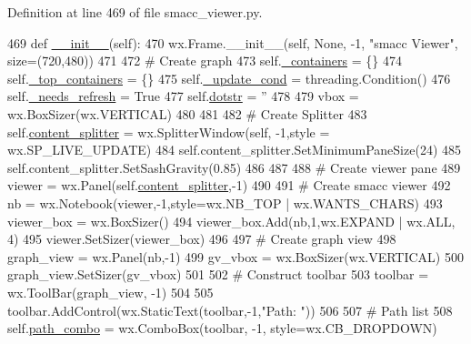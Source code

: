 Definition at line 469 of file smacc\+\_\+viewer.\+py.


\begin{DoxyCode}
469     \textcolor{keyword}{def }\hyperlink{classsmacc__viewer_1_1SmaccViewerFrame_a190917c46c5ee67c31da814f099fa044}{\_\_init\_\_}(self):
470         wx.Frame.\_\_init\_\_(self, \textcolor{keywordtype}{None}, -1, \textcolor{stringliteral}{"smacc Viewer"}, size=(720,480))
471 
472         \textcolor{comment}{# Create graph}
473         self.\hyperlink{classsmacc__viewer_1_1SmaccViewerFrame_a00ea07c6cc068340230dcac273ad5e90}{\_containers} = \{\}
474         self.\hyperlink{classsmacc__viewer_1_1SmaccViewerFrame_acc2f4310b3de2703026548d0d18387ea}{\_top\_containers} = \{\}
475         self.\hyperlink{classsmacc__viewer_1_1SmaccViewerFrame_a87c1757aa21438ca8692b2f079b8f393}{\_update\_cond} = threading.Condition()
476         self.\hyperlink{classsmacc__viewer_1_1SmaccViewerFrame_a42ba63ae6741b2ced224cc0f8aa48bff}{\_needs\_refresh} = \textcolor{keyword}{True}
477         self.\hyperlink{classsmacc__viewer_1_1SmaccViewerFrame_af4c9a551ac2933b05aaae2adcbb26d63}{dotstr} = \textcolor{stringliteral}{''}
478 
479         vbox = wx.BoxSizer(wx.VERTICAL)
480 
481 
482         \textcolor{comment}{# Create Splitter}
483         self.\hyperlink{classsmacc__viewer_1_1SmaccViewerFrame_a601f77701e7f32378b77b1b154e27215}{content\_splitter} = wx.SplitterWindow(self, -1,style = wx.SP\_LIVE\_UPDATE)
484         self.content\_splitter.SetMinimumPaneSize(24)
485         self.content\_splitter.SetSashGravity(0.85)
486 
487 
488         \textcolor{comment}{# Create viewer pane}
489         viewer = wx.Panel(self.\hyperlink{classsmacc__viewer_1_1SmaccViewerFrame_a601f77701e7f32378b77b1b154e27215}{content\_splitter},-1)
490 
491         \textcolor{comment}{# Create smacc viewer }
492         nb = wx.Notebook(viewer,-1,style=wx.NB\_TOP | wx.WANTS\_CHARS)
493         viewer\_box = wx.BoxSizer()
494         viewer\_box.Add(nb,1,wx.EXPAND | wx.ALL, 4)
495         viewer.SetSizer(viewer\_box)
496 
497         \textcolor{comment}{# Create graph view}
498         graph\_view = wx.Panel(nb,-1)
499         gv\_vbox = wx.BoxSizer(wx.VERTICAL)
500         graph\_view.SetSizer(gv\_vbox)
501 
502         \textcolor{comment}{# Construct toolbar}
503         toolbar = wx.ToolBar(graph\_view, -1)
504 
505         toolbar.AddControl(wx.StaticText(toolbar,-1,\textcolor{stringliteral}{"Path: "}))
506 
507         \textcolor{comment}{# Path list}
508         self.\hyperlink{classsmacc__viewer_1_1SmaccViewerFrame_a2b2ee042e4a0d11372e1d12c1925a286}{path\_combo} = wx.ComboBox(toolbar, -1, style=wx.CB\_DROPDOWN)

\end{DoxyCode}
